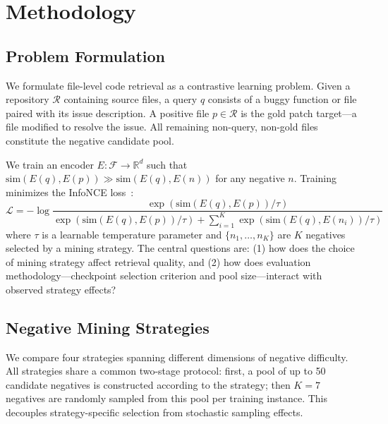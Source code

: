 \section{Methodology}
\label{sec:method}

\subsection{Problem Formulation}
\label{sec:formulation}

We formulate file-level code retrieval as a contrastive learning problem.
Given a repository $\mathcal{R}$ containing source files, a query $q$ consists of a buggy function or file paired with its issue description.
A positive file $p \in \mathcal{R}$ is the gold patch target---a file modified to resolve the issue.
All remaining non-query, non-gold files constitute the negative candidate pool.

We train an encoder $E: \mathcal{F} \to \mathbb{R}^d$ such that $\text{sim}(E(q), E(p)) \gg \text{sim}(E(q), E(n))$ for any negative $n$.
Training minimizes the InfoNCE loss~\cite{oord2018representation}:
\begin{equation}
\mathcal{L} = -\log \frac{\exp(\text{sim}(E(q), E(p)) / \tau)}{\exp(\text{sim}(E(q), E(p)) / \tau) + \sum_{i=1}^{K} \exp(\text{sim}(E(q), E(n_i)) / \tau)}
\label{eq:infonce}
\end{equation}
where $\tau$ is a learnable temperature parameter and $\{n_1, \ldots, n_K\}$ are $K$ negatives selected by a mining strategy.
The central questions are: (1) how does the choice of mining strategy affect retrieval quality, and (2) how does evaluation methodology---checkpoint selection criterion and pool size---interact with observed strategy effects?

\subsection{Negative Mining Strategies}
\label{sec:mining}

We compare four strategies spanning different dimensions of negative difficulty.
All strategies share a common two-stage protocol: first, a pool of up to 50 candidate negatives is constructed according to the strategy; then $K{=}7$ negatives are randomly sampled from this pool per training instance.
This decouples strategy-specific selection from stochastic sampling effects.

